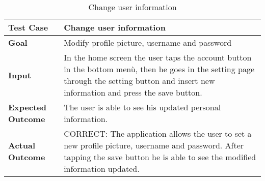 \begin{table}[H]
	\centering
	\begin{tabular}{ll}
	\hline
	\textbf{Test Case}& Change user information\\
	\hline
	\textbf{Goal}& Modify profile picture, username and password\\
	\hline
	\textbf{Input}& In the home screen the user taps the account button in the bottom menù, then he goes in the setting page through the setting button and insert new information and press the save button.\\
	\hline
	\textbf{Expected Outcome}& The user is able to see his updated personal information.\\
	\hline
	\textbf{Actual Outcome}& CORRECT: The application allows the user to set a new profile picture, username and password. After tapping the save button he is able to see the modified information updated.\\
	\hline	
	\end{tabular}
	\caption{Change user information}
\end{table}